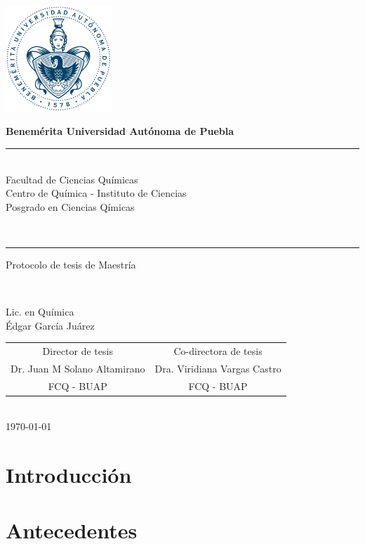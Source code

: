 \documentclass[11pt]{article}
\newcommand\vtab[1][0.5cm]{\vspace*{#1}}
\begin{document}
\pagestyle{empty} 
\phantom{a}
\vspace{-1.4cm}
\begin{center}
\includegraphics[width=4cm]{buap.pdf}

\Large{\textbf{Benemérita Universidad Autónoma de Puebla}\\
\rule{150mm}{0.1mm}\\
Facultad de Ciencias Químicas\\
Centro de Química - Instituto de Ciencias\\
Posgrado en Ciencias Qímicas}\\
\rule{150mm}{0.1mm}

\vtab[.1cm]
\Large{Protocolo de tesis de Maestría}\\
\vtab[0.2cm]

\large{\textbf{}}\\
\vtab[0.2cm]

Lic. en Química \\
Édgar García Juárez \\
\vtab[0.5cm]
\begin{tabular}{cc}
\vtab[10mm]
Director de tesis & Co-directora de tesis \\
Dr. Juan M Solano Altamirano & Dra. Viridiana Vargas Castro \\ 
FCQ - BUAP & FCQ - BUAP \\ 
\end{tabular} 
\vtab[1cm] \\
{\today}
\end{center}

\clearpage

\section{Introducción}


\section{Antecedentes}
\end{document}
